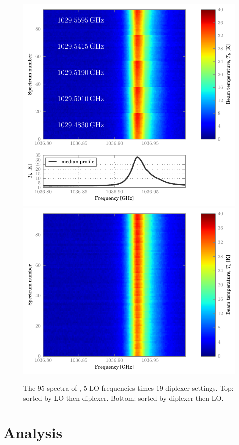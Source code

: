 \begin{figure}
    \centering
    \includegraphics[width=.9\textwidth]{overview_co98}
    \includegraphics[width=.9\textwidth]{overview_co98_flipped}
    \caption{The 95 spectra of , 5 LO frequencies times 19 diplexer settings.
    Top: sorted by LO then diplexer.  Bottom: sorted by diplexer then LO.}
    \label{fig:overview_co98}
\end{figure}





\section{Analysis}
